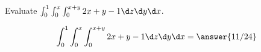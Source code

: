 \documentclass{ximera}
\author{David Guichard \and Neal Koblitz \and H. Jerome Keisler \and Albert Scheller \and Barry Balof \and Mike Wills \and Matthew Carr}
\begin{document}
\begin{exercise}





Evaluate  $\int_{0}^{1}\int_{0}^{x}\int_{0}^{x+y}2x+y-1\d z\d y\d x$.

\begin{prompt}
\[
\int_{0}^{1}\int_{0}^{x}\int_{0}^{x+y}2x+y-1\d z\d y\d x=\answer{11/24}
\]
\end{prompt}



\end{exercise}
\end{document}
